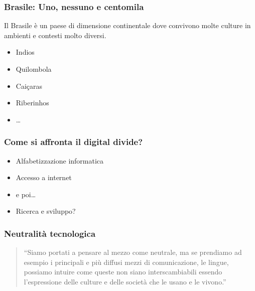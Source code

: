 \documentclass{beamer}
\begin{document}
{

\begin{frame}

  \frametitle{Brasile: Uno, nessuno e centomila}
  Il Brasile è un paese di dimensione continentale dove convivono
  molte culture in ambienti e contesti molto diversi. 
  \begin{itemize}
  \item Indios
  \item Quilombola
  \item Caiçaras
  \item Riberinhos
  \item \ldots
  \end{itemize}

\end{frame}

}

\begin{frame}

  \frametitle{Come si affronta il digital divide?}
  \begin{itemize}
    \item Alfabetizzazione informatica
    \item Accesso a internet
    \item e poi\ldots
    \item Ricerca e sviluppo?
    \end{itemize}

 \end{frame}

\begin{frame}

  \frametitle{Neutralità tecnologica}

  \begin{quote}
    ``Siamo portati a pensare al mezzo come neutrale, ma se prendiamo
    ad esempio i principali e più diffusi mezzi di comunicazione, le
    lingue, possiamo intuire come queste non siano interscambiabili
    essendo l'espressione delle culture e delle società che le usano e
    le vivono.''
  \end{quote}
  
\end{frame}
\end{document}
